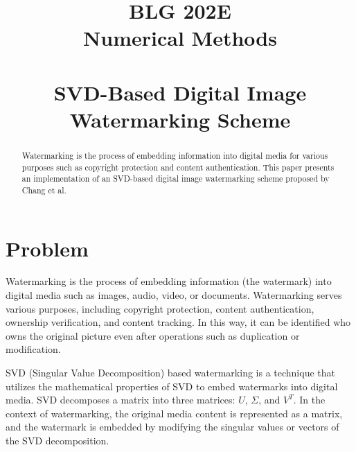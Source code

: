 \documentclass[conference]{IEEEtran}
\begin{document}
\title{BLG 202E \\Numerical Methods \\ \\SVD-Based Digital Image Watermarking Scheme}

\author{
}

\maketitle




\thispagestyle{empty}
\setcounter{tocdepth}{4}
\tableofcontents


\setcounter{page}{1}
\vspace{30pt}

\begin{abstract}
Watermarking is the process of embedding information into digital media for various purposes such as copyright protection and content authentication. This paper presents an implementation of an SVD-based digital image watermarking scheme proposed by Chang et al.
\end{abstract}

\section{Problem}
Watermarking is the process of embedding information (the watermark) into digital media such as images, audio, video, or documents. Watermarking serves various purposes, including copyright protection, content authentication, ownership verification, and content tracking. In this way, it can be identified who owns the original picture even after operations such as duplication or modification.

SVD (Singular Value Decomposition) based watermarking is a technique that utilizes the mathematical properties of SVD to embed watermarks into digital media. SVD decomposes a matrix into three matrices: $U$, $\Sigma$, and $V^T$. In the context of watermarking, the original media content is represented as a matrix, and the watermark is embedded by modifying the singular values or vectors of the SVD decomposition.
\end{document}
